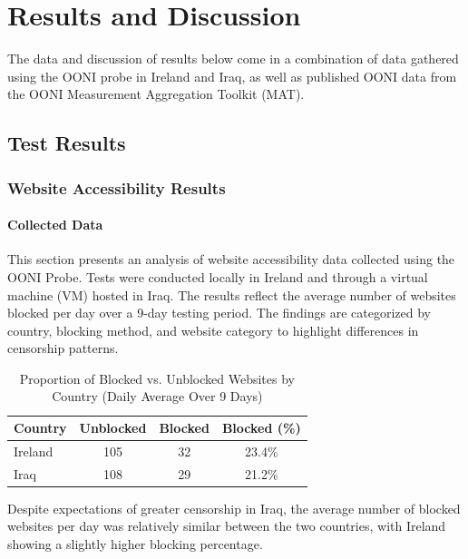 \chapter{Results and Discussion}

The data and discussion of results below come in a combination of data gathered using the OONI probe in Ireland and Iraq, as well as published OONI data from the OONI Measurement Aggregation Toolkit (MAT).

\section{Test Results}

\subsection{Website Accessibility Results}

\subsubsection{Collected Data}

This section presents an analysis of website accessibility data collected using the OONI Probe. Tests were conducted locally in Ireland and through a virtual machine (VM) hosted in Iraq. The results reflect the average number of websites blocked per day over a 9-day testing period. The findings are categorized by country, blocking method, and website category to highlight differences in censorship patterns.

\vspace{2em}

\begin{table}[H] 
\centering 
\caption{Proportion of Blocked vs. Unblocked Websites by Country (Daily Average Over 9 Days)} 
\begin{tabular}{lccc} 
\toprule 
\textbf{Country} & \textbf{Unblocked} & \textbf{Blocked} & \textbf{Blocked (\%)} \\
\midrule 
Ireland & 105 & 32 & 23.4\%  \\
Iraq & 108 & 29 & 21.2\% \\
\bottomrule 
\end{tabular} 
\label{tab:blocked_summary} 
\end{table}

Despite expectations of greater censorship in Iraq, the average number of blocked websites per day was relatively similar between the two countries, with Ireland showing a slightly higher blocking percentage. 

